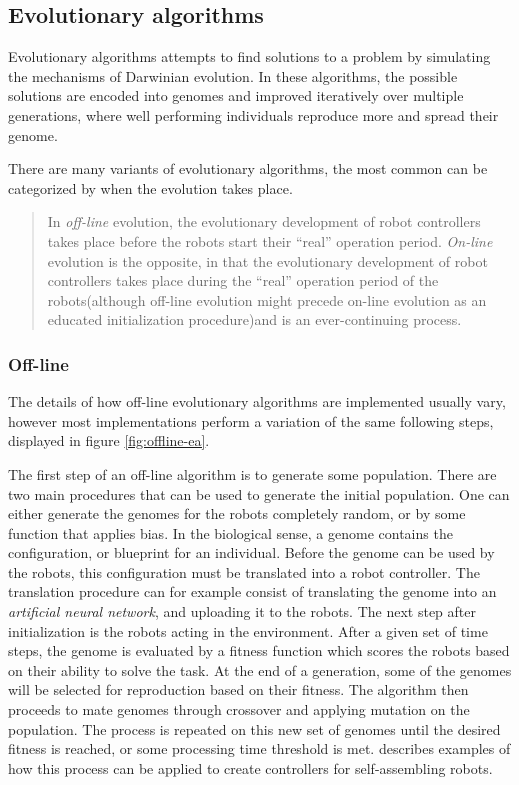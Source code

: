 \subsection{Evolutionary algorithms}
Evolutionary algorithms attempts to find solutions to a problem by simulating the mechanisms of Darwinian evolution\cite{trianni_evolving_2004}.
In these algorithms, the possible solutions are encoded into genomes and improved iteratively over multiple generations, where well performing individuals reproduce more and spread their genome.

There are many variants of evolutionary algorithms, the most common can be categorized by when the evolution takes place\cite{eiben_embodied_2010}.
\begin{quote} 
	In \emph{off-line} evolution, the evolutionary development of robot controllers takes place before the robots start their “real” operation period.
	\emph{On-line} evolution is the opposite, in that the evolutionary development of robot controllers takes place during the “real” operation period of the robots(although off-line evolution might precede on-line evolution as an educated initialization procedure)and is an ever-continuing process.\cite{eiben_embodied_2010}
\end{quote} 


\subsubsection*{Off-line}
The details of how off-line evolutionary algorithms are implemented usually vary, however most implementations perform a variation of the same following steps\cite{doncieux_evolutionary_2011}, displayed in figure \ref{fig:offline-ea}. 

The first step of an off-line algorithm is to generate some population.
There are two main procedures that can be used to generate the initial population.	 
One can either generate the genomes for the robots completely random, or by some function that applies bias.
In the biological sense, a genome contains the configuration, or blueprint for an individual.
Before the genome can be used by the robots, this configuration must be translated into a robot controller.
The translation procedure can for example consist of translating the genome into an \emph{artificial neural network}, and uploading it to the robots.
The next step after initialization is the robots acting in the environment.
After a given set of time steps, the genome is evaluated by a fitness function which scores the robots based on their ability to solve the task.	 
At the end of a generation, some of the genomes will be selected for reproduction based on their fitness.	 
The algorithm then proceeds to mate genomes through crossover and applying mutation on the population.	 
The process is repeated on this new set of genomes until the desired fitness is reached, or some processing time threshold is met.
\cite{trianni_evolving_2004}\cite{li_co-evolution_2015} describes examples of how this process can be applied to create controllers for self-assembling robots. 

